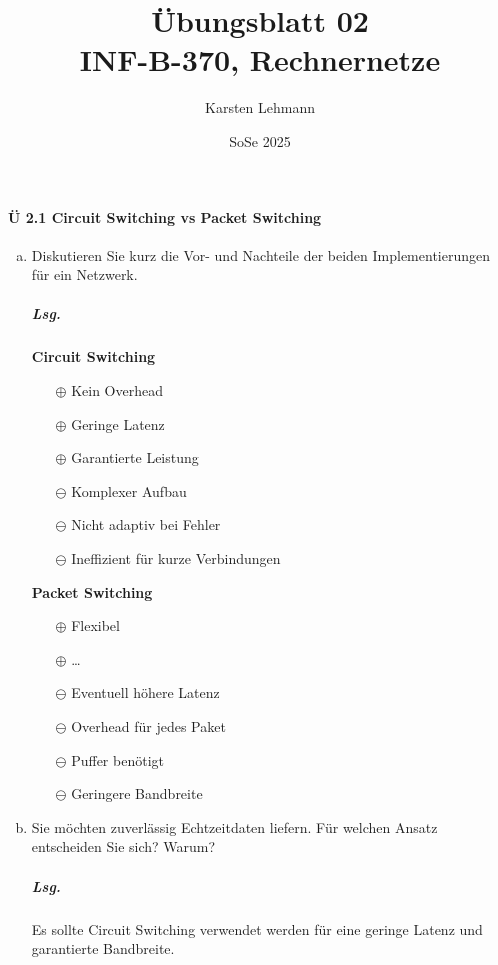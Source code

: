 \documentclass{scrreprt}
\author{Karsten Lehmann}
\date{SoSe 2025}
\title{Übungsblatt 02\\INF-B-370, Rechnernetze}
\begin{document}
\paragraph{Ü 2.1 Circuit Switching vs Packet Switching}
\begin{enumerate}[(a)]
\item Diskutieren Sie kurz die Vor- und Nachteile der beiden Implementierungen
  für ein Netzwerk.

  \subparagraph{Lsg.} \phantom{\null}

  \begin{minipage}{0.45\textwidth}
    \textbf{Circuit Switching}

    \begin{itemize}
    \item[$\oplus$] Kein Overhead
    \item[$\oplus$] Geringe Latenz
    \item[$\oplus$] Garantierte Leistung
    \item[$\ominus$] Komplexer Aufbau
    \item[$\ominus$] Nicht adaptiv bei Fehler
    \item[$\ominus$] Ineffizient für kurze Verbindungen
    \end{itemize}
  \end{minipage}
  \begin{minipage}{0.45\textwidth}
    \textbf{Packet Switching}

    \begin{itemize}
    \item[$\oplus$] Flexibel
    \item[$\oplus$] \ldots
    \item[$\ominus$] Eventuell höhere Latenz
    \item[$\ominus$] Overhead für jedes Paket
    \item[$\ominus$] Puffer benötigt
    \item[$\ominus$] Geringere Bandbreite
    \end{itemize}
  \end{minipage}

\item Sie möchten zuverlässig Echtzeitdaten liefern.
  Für welchen Ansatz entscheiden Sie sich?
  Warum?

  \subparagraph{Lsg.} Es sollte Circuit Switching verwendet werden für eine
  geringe Latenz und garantierte Bandbreite.
\end{enumerate}
\end{document}
